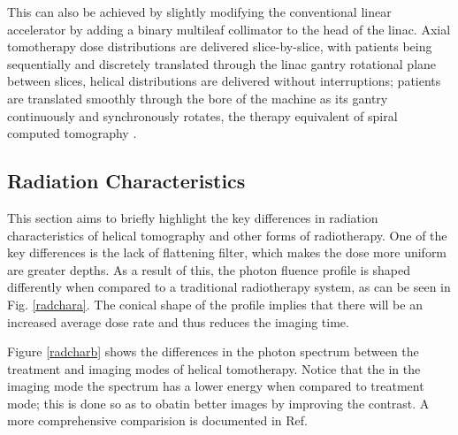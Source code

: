 \documentclass[10pt,journal,compsoc]{IEEEtran} %
\begin{document}
  This can also be achieved by slightly modifying the conventional linear 
  accelerator by adding a binary multileaf collimator to the head of the linac. 
  Axial tomotherapy dose distributions are delivered slice-by-slice, with 
  patients being sequentially and discretely translated through the linac 
  gantry rotational plane between slices, helical distributions are delivered 
  without interruptions; patients are translated smoothly through the bore of 
  the machine as its gantry continuously and synchronously rotates, the 
  therapy equivalent of spiral computed tomography \cite{Fenwick2006}. 
  \subsection{Radiation Characteristics}
  \label{radiation}
  This section aims to briefly highlight the key differences in radiation 
  characteristics of helical tomography and other forms of radiotherapy. One of 
  the key differences is the lack of flattening filter, which makes the dose 
  more uniform are greater depths. As a result of this, the photon fluence 
  profile is shaped differently when compared to a traditional radiotherapy 
  system, as can be seen in Fig. \ref{radchara}. The conical shape of the 
  profile implies that there will be an increased average dose rate and thus 
  reduces the imaging time. 
  
  Figure \ref{radcharb} shows the differences in the photon spectrum between 
  the 
  treatment and imaging modes of helical tomotherapy. Notice that the in the 
  imaging mode the spectrum has a lower energy when compared to treatment mode; 
  this is done so as to obatin better images by improving the contrast. A more 
  comprehensive comparision is documented in Ref. \cite{Jeraj2004}
  
\end{document}
